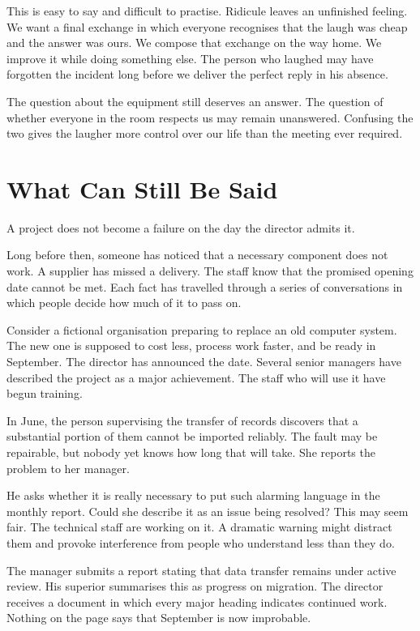 \documentclass[12pt,a4paper]{book}
\begin{document}
This is easy to say and difficult to practise. Ridicule leaves an unfinished feeling. We want a final exchange in which everyone recognises that the laugh was cheap and the answer was ours. We compose that exchange on the way home. We improve it while doing something else. The person who laughed may have forgotten the incident long before we deliver the perfect reply in his absence.

The question about the equipment still deserves an answer. The question of whether everyone in the room respects us may remain unanswered. Confusing the two gives the laugher more control over our life than the meeting ever required.

\chapter{What Can Still Be Said}

A project does not become a failure on the day the director admits it.

Long before then, someone has noticed that a necessary component does not work. A supplier has missed a delivery. The staff know that the promised opening date cannot be met. Each fact has travelled through a series of conversations in which people decide how much of it to pass on.

Consider a fictional organisation preparing to replace an old computer system. The new one is supposed to cost less, process work faster, and be ready in September. The director has announced the date. Several senior managers have described the project as a major achievement. The staff who will use it have begun training.

In June, the person supervising the transfer of records discovers that a substantial portion of them cannot be imported reliably. The fault may be repairable, but nobody yet knows how long that will take. She reports the problem to her manager.

He asks whether it is really necessary to put such alarming language in the monthly report. Could she describe it as an issue being resolved? This may seem fair. The technical staff are working on it. A dramatic warning might distract them and provoke interference from people who understand less than they do.

The manager submits a report stating that data transfer remains under active review. His superior summarises this as progress on migration. The director receives a document in which every major heading indicates continued work. Nothing on the page says that September is now improbable.
\end{document}
